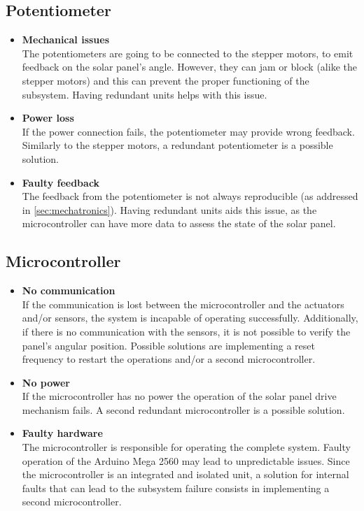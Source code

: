 \subsection{Potentiometer}
\begin{itemize}
    \item \textbf{Mechanical issues}\\
    The potentiometers are going to be connected to the stepper motors, to emit feedback on the solar panel's angle. However, they can jam or block (alike the stepper motors) and this can prevent the proper functioning of the subsystem. Having redundant units helps with this issue.
    
    \item \textbf{Power loss}\\
    If the power connection fails, the potentiometer may provide wrong feedback. Similarly to the stepper motors, a redundant potentiometer is a possible solution.
    
    \item \textbf{Faulty feedback}\\
    The feedback from the potentiometer is not always reproducible (as addressed in \autoref{sec:mechatronics}). Having redundant units aids this issue, as the microcontroller can have more data to assess the state of the solar panel.
    
    
\end{itemize}

\subsection{Microcontroller}
\begin{itemize}
    \item  \textbf{No communication}\\ 
    If the communication is lost between the microcontroller and the actuators and/or sensors, the system is incapable of operating successfully. Additionally, if there is no communication with the sensors, it is not possible to verify the panel's angular position. Possible solutions are implementing a reset frequency to restart the operations and/or a second microcontroller.
    
    \item \textbf{No power}\\
    If the microcontroller has no power the operation of the solar panel drive mechanism fails. A second redundant microcontroller is a possible solution.   
    \item \textbf{Faulty hardware} \\
    The microcontroller is responsible for operating the complete system. Faulty operation of the Arduino Mega 2560 may lead to unpredictable issues. Since the microcontroller is an integrated and isolated unit, a solution for internal faults that can lead to the subsystem failure consists in implementing a second microcontroller.
\end{itemize}

